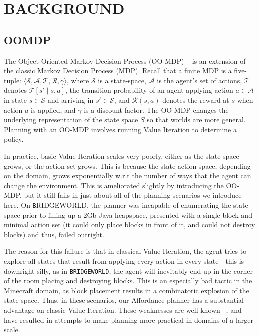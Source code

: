 \documentclass[]{article}
\begin{document}
\section{BACKGROUND}

\subsection{OOMDP}

The Object Oriented Markov Decision Process (OO-MDP) ~\citep{diuk08} is an extension of the classic Markov Decision Process (MDP). Recall that a finite MDP is a five-tuple: $\langle \mathcal{S}, \mathcal{A}, \mathcal{T}, \mathcal{R}, \gamma \rangle$, where $\mathcal{S}$ is a state-space, $\mathcal{A}$ is the agent's set of actions, $\mathcal{T}$ denotes $\mathcal{T}[s' \mid s,a]$, the transition probability of an agent applying action $a \in \mathcal{A}$ in state $s \in \mathcal{S}$ and arriving in $s' \in \mathcal{S}$, and $\mathcal{R}(s,a)$ denotes the reward at $s$ when action $a$ is applied, and $\gamma$ is a discount factor. The OO-MDP changes the underlying representation of the state space $S$ so that worlds are more general. Planning with an OO-MDP involves running Value Iteration to determine a policy.

In practice, basic Value Iteration scales very poorly, either as the state space grows, or the action set grows. This is because the state-action space, depending on the domain, grows exponentially w.r.t the number of ways that the agent can change the environment. This is ameliorated slightly by introducing the OO-MDP, but it still fails in just about all of the planning scenarios we introduce here. On {\texttt BRIDGEWORLD}, the planner was incapable of enumerating the state space prior to filling up a 2Gb Java heapspace, presented with a single block and minimal action set (it could only place blocks in front of it, and could not destroy blocks) and thus, failed outright.

The reason for this failure is that in classical Value Iteration, the agent tries to explore all states that result from applying every action in every state - this is downright silly, as in \texttt{BRIDGEWORLD}, the agent will inevitably end up in the corner of the room placing and destroying blocks. This is an especially bad tactic in the Minecraft domain, as block placement results in a combinatoric explosion of the state space. Thus, in these scenarios, our Affordance planner has a substantial advantage on classic Value Iteration. These weaknesses are well known ~\citep{grounds}, and have resulted in attempts to make planning more practical in domains of a larger scale.
\end{document}
